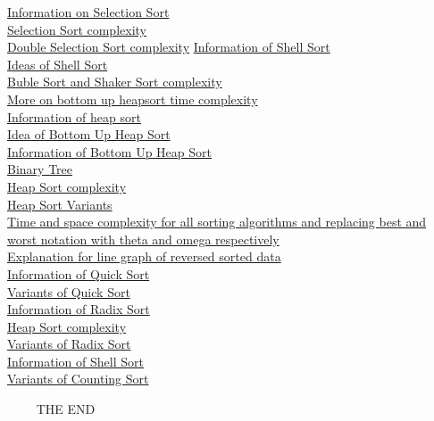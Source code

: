 \documentclass{article}
\begin{document}
\href{https://en.wikipedia.org/wiki/Selection_sort#Complexity}{Information on Selection Sort}\\
\href{https://en.wikipedia.org/wiki/Selection_sort#Complexity}{Selection Sort complexity}\\
\href{https://cs.stackexchange.com/questions/111243/complexity-of-double-selection-sort}{Double Selection Sort complexity}
\href{https://www.geeksforgeeks.org/shellsort/}{Information of Shell Sort}\\
\href{https://en.wikipedia.org/wiki/Shellsort#Description}{Ideas of Shell Sort}\\
\href{https://stackabuse.com/bubble-sort-and-cocktail-shaker-sort-in-javascript/}{Buble Sort and Shaker Sort complexity}\\
\href{https://www.researchgate.net/publication/225806123_A_tight_lower_bound_for_the_worst_case_of_Bottom-Up-Heapsort}{More on bottom up heapsort time complexity}\\
\href{https://www.geeksforgeeks.org/heap-sort/}{Information of heap sort}\\
\href{https://cs.stackexchange.com/questions/11415/how-to-perform-bottom-up-construction-of-heaps}{Idea of Bottom Up Heap Sort}\\
\href{https://www.happycoders.eu/algorithms/heapsort/#Bottom-Up_Heapsort}{Information of Bottom Up Heap Sort}\\
\href{https://en.wikipedia.org/wiki/Binary_tree#Types_of_binary_trees}{Binary Tree}\\
\href{https://www.happycoders.eu/algorithms/heapsort/#Heapsort_Time_Complexity}{Heap Sort complexity}\\
\href{https://en.wikipedia.org/wiki/Heapsort#Variations}{Heap Sort Variants}\\
\href{https://www.geeksforgeeks.org/time-complexities-of-all-sorting-algorithms/}{Time and space complexity for all sorting algorithms and replacing best and worst notation with theta and omega respectively}\\
\href{https://en.wikipedia.org/wiki/Cocktail_shaker_sort#Complexity}{Explanation for line graph of reversed sorted data}\\
\href{https://www.geeksforgeeks.org/quick-sort/}{Information of Quick Sort}\\
\href{https://en.wikipedia.org/wiki/Quicksort#Variants}{Variants of Quick Sort}\\
\href{https://www.geeksforgeeks.org/radix-sort/}{Information of Radix Sort}\\
\href{https://www.simplilearn.com/tutorials/data-structure-tutorial/radix-sort#performance_of_radix_sort_algorithm}{Heap Sort complexity}\\
\href{https://www.growingwiththeweb.com/sorting/radix-sort-lsd/}{Variants of Radix Sort}\\
\href{https://www.javatpoint.com/shell-sort}{Information of Shell Sort}\\
\href{https://en.wikipedia.org/wiki/Counting_sort#Variant_algorithms}{Variants of Counting Sort}\\

\centerline{\Large{~~~~ THE END ~~~~}}
\end{document}
